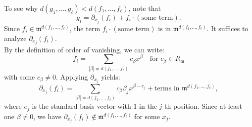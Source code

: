\begin{remark}
    To see why $d(g_1, \dots, g_{\ell}) < d(f_1, \dots, f_{\ell})$, note that
    \[
        g_i = \partial_{x_j}(f_i) + f_i \cdot (\text{some term}).
    \]
    Since $f_i \in \mathfrak{m}^{d(f_1, \dots, f_{\ell})}$, the term $f_i \cdot (\text{some term})$ is in $\mathfrak{m}^{d(f_1, \dots, f_{\ell})}$.
    It suffices to analyze $\partial_{x_j}(f_i)$.\\
    By the definition of order of vanishing, we can write:
    \[
        f_i = \sum_{|\beta| = d(f_1, \dots, f_{\ell})} c_\beta x^\beta \quad \text{for } c_\beta \in R_{\mathfrak{m}}
    \]
    with some $c_\beta \neq 0$.
    Applying $\partial_{x_j}$ yields:
    \[
        \partial_{x_j}(f_i) = \sum_{|\beta| = d(f_1, \dots, f_{\ell})} c_\beta \beta_j x^{\beta - e_j} + \text{terms in } \mathfrak{m}^{d(f_1, \dots, f_{\ell})},
    \]
    where $e_j$ is the standard basis vector with $1$ in the $j$-th position.
    Since at least one $\beta \neq 0$, we have $\partial_{x_j}(f_i) \notin \mathfrak{m}^{d(f_1, \dots, f_{\ell})}$ for some $x_j$.
\end{remark}
